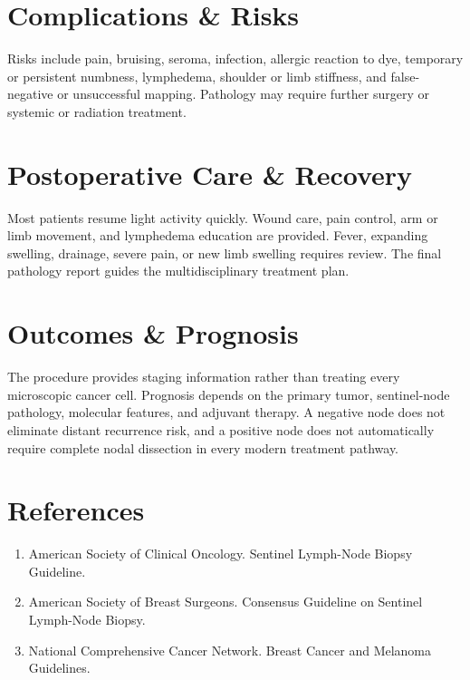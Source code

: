 \section*{Complications \& Risks}
Risks include pain, bruising, seroma, infection, allergic reaction to dye, temporary or persistent numbness, lymphedema, shoulder or limb stiffness, and false-negative or unsuccessful mapping. Pathology may require further surgery or systemic or radiation treatment.

\section*{Postoperative Care \& Recovery}
Most patients resume light activity quickly. Wound care, pain control, arm or limb movement, and lymphedema education are provided. Fever, expanding swelling, drainage, severe pain, or new limb swelling requires review. The final pathology report guides the multidisciplinary treatment plan.

\section*{Outcomes \& Prognosis}
The procedure provides staging information rather than treating every microscopic cancer cell. Prognosis depends on the primary tumor, sentinel-node pathology, molecular features, and adjuvant therapy. A negative node does not eliminate distant recurrence risk, and a positive node does not automatically require complete nodal dissection in every modern treatment pathway.

\section*{References}
\begin{enumerate}
  \item American Society of Clinical Oncology. Sentinel Lymph-Node Biopsy Guideline.
  \item American Society of Breast Surgeons. Consensus Guideline on Sentinel Lymph-Node Biopsy.
  \item National Comprehensive Cancer Network. Breast Cancer and Melanoma Guidelines.
\end{enumerate}

\clearpage
